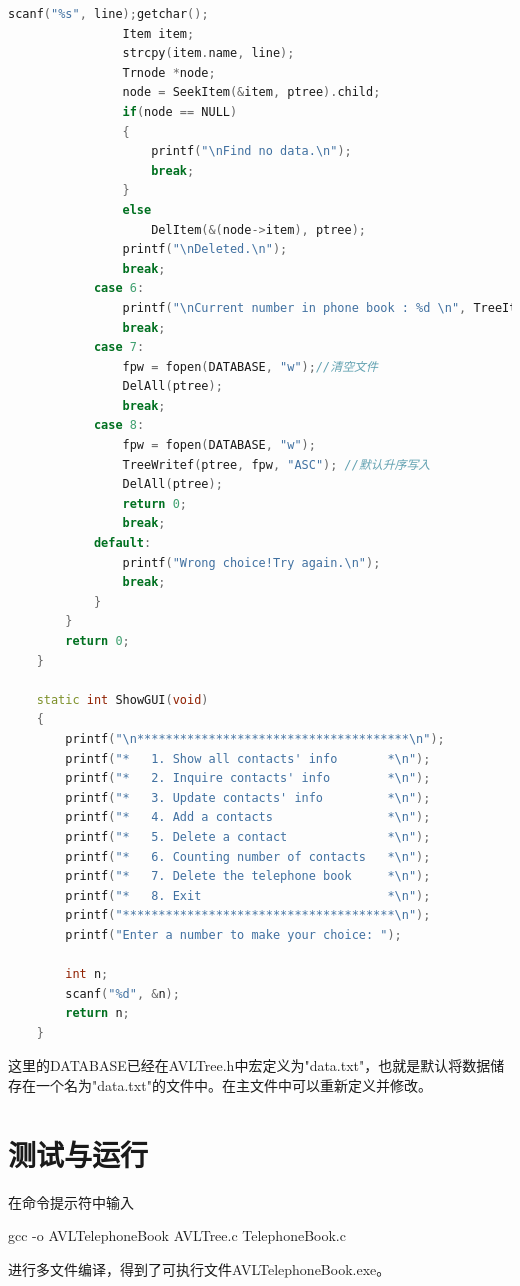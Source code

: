 \documentclass[12pt, a4paper, oneside]{ctexart}
\begin{document}
\begin{framed}
\begin{lstlisting}[language=C++]
                scanf("%s", line);getchar();
                Item item;
                strcpy(item.name, line);
                Trnode *node;
                node = SeekItem(&item, ptree).child;
                if(node == NULL)
                {
                    printf("\nFind no data.\n");
                    break;
                }
                else
                    DelItem(&(node->item), ptree);
                printf("\nDeleted.\n");
                break;
            case 6:
                printf("\nCurrent number in phone book : %d \n", TreeItemCount(ptree));
                break;
            case 7:
                fpw = fopen(DATABASE, "w");//清空文件
                DelAll(ptree);
                break;
            case 8:
                fpw = fopen(DATABASE, "w");
                TreeWritef(ptree, fpw, "ASC"); //默认升序写入
                DelAll(ptree);
                return 0;
                break;
            default:
                printf("Wrong choice!Try again.\n");
                break;
            }
        }
        return 0;
    }
    
    static int ShowGUI(void)
    {
        printf("\n**************************************\n");
        printf("*   1. Show all contacts' info       *\n");
        printf("*   2. Inquire contacts' info        *\n");
        printf("*   3. Update contacts' info         *\n");
        printf("*   4. Add a contacts                *\n");
        printf("*   5. Delete a contact              *\n");
        printf("*   6. Counting number of contacts   *\n");
        printf("*   7. Delete the telephone book     *\n");
        printf("*   8. Exit                          *\n");
        printf("**************************************\n");
        printf("Enter a number to make your choice: ");
    
        int n;
        scanf("%d", &n);
        return n;
    }
\end{lstlisting}
\end{framed}
这里的DATABASE已经在AVLTree.h中宏定义为"data.txt"，也就是默认将数据储存在一个名为"data.txt"的文件中。在主文件中可以重新定义并修改。

\section{测试与运行}
在命令提示符中输入
\begin{framed}
    gcc -o AVLTelephoneBook AVLTree.c TelephoneBook.c
\end{framed}
进行多文件编译，得到了可执行文件AVLTelephoneBook.exe。
\end{document}
